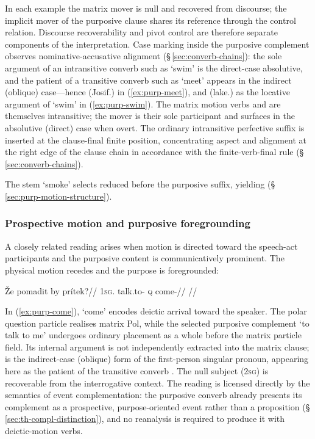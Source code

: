 In each example the matrix mover is null and recovered from discourse;
the implicit mover of the purposive clause shares its reference through
the control relation. Discourse recoverability and pivot control are
therefore separate components of the interpretation. Case marking inside the purposive
complement observes nominative-accusative alignment
(§\,\ref{sec:converb-chains}): the sole argument of an intransitive converb such
as  `swim' is the direct-case absolutive, and the patient of a
transitive converb such as  `meet' appears in the indirect (oblique)
case---hence  (Josif.\Ind{}) in (\ref{ex:purp-meet}), and
 (lake.\Ind{}) as the locative argument of `swim' in
(\ref{ex:purp-swim}). The matrix motion verbs  and  are
themselves intransitive; the mover is their sole participant and surfaces in the
absolutive (direct) case when overt. The ordinary intransitive perfective suffix  is
inserted at the clause-final finite position, concentrating aspect and alignment
at the right edge of the clause chain in accordance with the finite-verb-final
rule (§\,\ref{sec:converb-chains}).

The stem  `smoke' selects reduced  before the
purposive suffix, yielding  (§\,\ref{sec:purp-motion-structure}).

\subsubsection{Prospective motion and purposive
foregrounding}\label{sec:purp-motion-prospective}

A closely related reading arises when motion is directed toward the speech-act
participants and the purposive content is communicatively prominent. The
physical motion recedes and the purpose is foregrounded:

\ex\label{ex:purp-come}%
\begingl
\gla Že pomadit by prítek?//
\glb \textsc{1sg}.\Ind{} talk.to-\Purp{} \textsc{q} come-\Pf{}//
\glft {}//
\endgl
\xe

In (\ref{ex:purp-come}),  `come' encodes deictic arrival toward the
speaker. The polar question particle  realises matrix Pol, while
the selected purposive complement  `to talk to me' undergoes
ordinary placement as a whole before the matrix particle field. Its internal
argument is not independently extracted into the matrix clause;  is the indirect-case (oblique) form of the first-person singular
pronoun, appearing here as the patient of the transitive converb .
The null subject (\textsc{2sg}) is recoverable from the interrogative context.
The reading is licensed directly by the semantics of event complementation: the
purposive converb already presents its complement as a prospective,
purpose-oriented event rather than a proposition
(§\,\ref{sec:th-compl-distinction}), and no reanalysis is required to produce it
with deictic-motion verbs.

